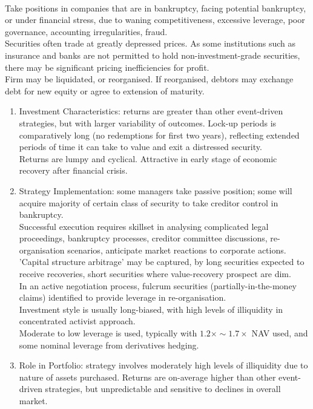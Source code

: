 \begin{remark} \\
Take positions in companies that are in bankruptcy, facing potential bankruptcy, or under financial stress, due to waning competitiveness, excessive leverage, poor governance, accounting irregularities, fraud.\\
Securities often trade at greatly depressed prices. As some institutions such as insurance and banks are not permitted to hold non-investment-grade securities, there may be significant pricing inefficiencies for profit.\\
Firm may be liquidated, or reorganised. If reorganised, debtors may exchange debt for new equity or agree to extension of maturity.
\begin{enumerate}[label=\roman*.]
\setlength{\itemsep}{0pt}
\item Investment Characteristics: returns are greater than other event-driven strategies, but with larger variability of outcomes. Lock-up periods is comparatively long (no redemptions for first two years), reflecting extended periods of time it can take to value and exit a distressed security.\\
Returns are lumpy and cyclical. Attractive in early stage of economic recovery after financial crisis.
\item Strategy Implementation: some managers take passive position; some will acquire majority of certain class of security to take creditor control in bankruptcy.\\
Successful execution requires skillset in analysing complicated legal proceedings, bankruptcy processes, creditor committee discussions, re-organisation scenarios, anticipate market reactions to corporate actions.\\
'Capital structure arbitrage' may be captured, by long securities expected to receive recoveries, short securities where value-recovery prospect are dim.\\
In an active negotiation process, fulcrum securities (partially-in-the-money claims) identified to provide leverage in re-organisation.\\
Investment style is usually long-biased, with high levels of illiquidity in concentrated activist approach.\\
Moderate to low leverage is used, typically with $1.2 \times \sim 1.7 \times$ NAV used, and some nominal leverage from derivatives hedging.
\item Role in Portfolio: strategy involves moderately high levels of illiquidity due to nature of assets purchased. Returns are on-average higher than other event-driven strategies, but unpredictable and sensitive to declines in overall market.
\end{enumerate}
\end{remark}

